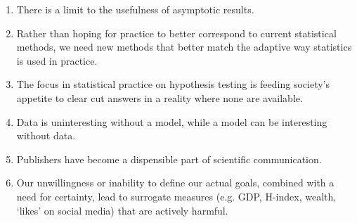 \documentclass[9pt,b5paper]{book}
\begin{document}
\begin{enumerate}[leftmargin=1.15em]
\item There is a limit to the usefulness of asymptotic results.

\item Rather than hoping for practice to better correspond to current statistical methods, we need new methods that better match the adaptive way statistics is used in practice.


\item The focus in statistical practice on hypothesis testing is feeding society's appetite to clear cut answers in a reality where none are available.

\item Data is uninteresting without a model, while a model can be interesting without data.





% 

% 

\item Publishers have become a dispensible part of scientific communication.

\item Our unwillingness or inability to define our actual goals, combined with a need for certainty, lead to surrogate measures (e.g. GDP, H-index, wealth, `likes' on social media) that are actively harmful.




\end{enumerate}
\end{document}
